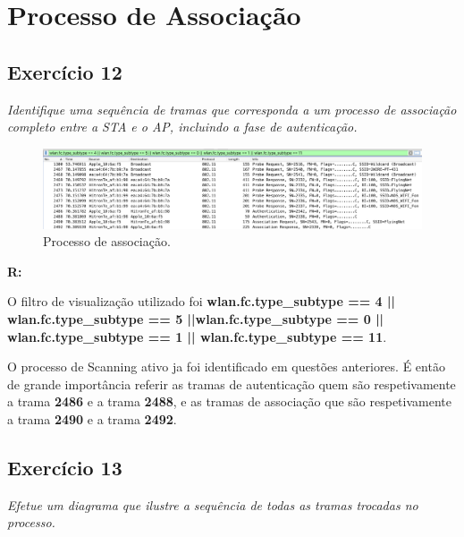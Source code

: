 \documentclass{llncs}
\begin{document}
\section{Processo de Associação}

\subsection{Exercício 12}
\emph{Identifique uma sequência de tramas que corresponda a um processo de associação completo entre a STA e o AP, incluindo a fase de autenticação.}
\begin{figure}[H]
\begin{center}
\includegraphics[scale=0.30]{12.png} 
\end{center}
\caption{\label{fig:12}Processo de associação.}
\end{figure} 
\par
\textbf{R:} 

O filtro de visualização utilizado foi \textbf{wlan.fc.type\_subtype == 4 || wlan.fc.type\_subtype == 5 ||wlan.fc.type\_subtype == 0 || wlan.fc.type\_subtype == 1 || wlan.fc.type\_subtype == 11}.

O processo de Scanning ativo ja foi identificado em questões anteriores. É então de grande importância referir as tramas de autenticação quem são respetivamente a trama \textbf{2486} e a trama \textbf{2488}, e as tramas de associação que são respetivamente a trama \textbf{2490} e a trama \textbf{2492}.


\subsection{Exercício 13}
\emph{Efetue um diagrama que ilustre a sequência de todas as tramas trocadas no processo.}
\end{document}
